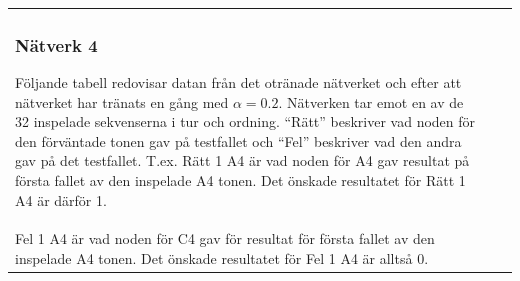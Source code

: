 \documentclass[a4paper,10pt]{article}
\begin{document}
{\begin{tabular}{ |l | l | l| }
\subsubsection{Nätverk 4}

Följande tabell redovisar datan från det otränade nätverket och efter att nätverket har tränats en gång med $\alpha=0.2$. Nätverken tar emot en av de 32 inspelade sekvenserna i tur och ordning. ``Rätt'' beskriver vad noden för den förväntade tonen gav på testfallet och ``Fel'' beskriver vad den andra gav på det testfallet. T.ex. Rätt 1 A4 är vad noden för A4 gav resultat på första fallet av den inspelade A4 tonen. Det önskade resultatet för Rätt 1 A4 är därför 1. \\
Fel 1 A4 är vad noden för C4 gav för resultat för första fallet av den inspelade A4 tonen. Det önskade resultatet för Fel 1 A4 är alltså 0.\\




\end{tabular}}
\end{document}
